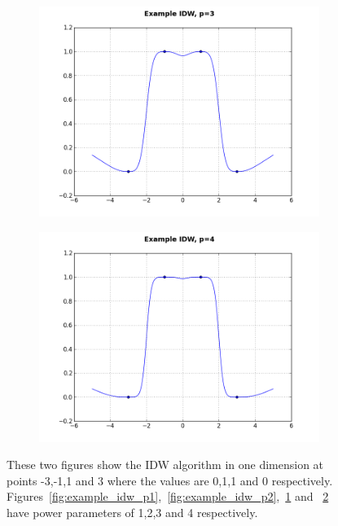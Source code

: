 \begin{figure}[H]
                \begin{subfigure}{.5\textwidth}
                    \centering
                    \includegraphics[width=\linewidth]{./images/IDWPF3.png}
                    \caption{}
                    \label{fig:example_idw_p3}
                \end{subfigure}%
                \begin{subfigure}{.5\textwidth}
                    \includegraphics[width=\linewidth]{./images/IDWPF4.png}
                    \caption{}
                    \label{fig:example_idw_p4}
                \end{subfigure}
                \caption{These two figures show the IDW algorithm in one dimension at points -3,-1,1 and 3 where the values are 0,1,1 and 0 respectively. Figures~\ref{fig:example_idw_p1},~\ref{fig:example_idw_p2},~\ref{fig:example_idw_p3} and ~\ref{fig:example_idw_p4} have power parameters of 1,2,3 and 4 respectively.}
                \label{fig:example_idw}
            \end{figure}


